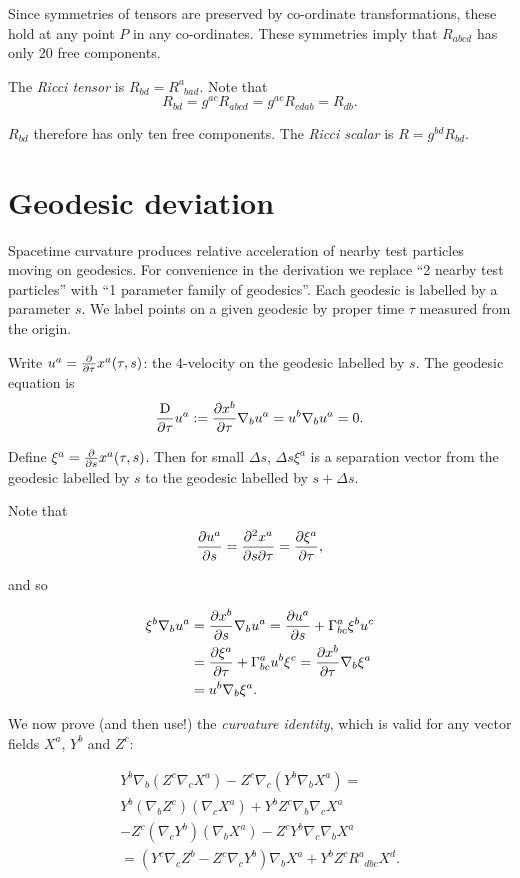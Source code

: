 \documentclass{notes}
\newcommand{\del}{\nabla}
\begin{document}
Since symmetries of tensors are preserved by co-ordinate
transformations, these hold at any point $P$ in any co-ordinates.
These symmetries imply that $R_{abcd}$ has only 20 free components.

The \emph{Ricci tensor} is $R_{bd} = R^a_{\phantom{a}bad}$.  Note that
\[
R_{bd} = g^{ac} R_{abcd} = g^{ac} R_{cdab} = R_{db}.
\]

$R_{bd}$ therefore has only ten free components.  The \emph{Ricci
  scalar} is $R = g^{bd} R_{bd}$.

\section{Geodesic deviation}

Spacetime curvature produces relative acceleration of nearby test
particles moving on geodesics.  For convenience in the derivation we
replace ``2 nearby test particles'' with ``1 parameter family of
geodesics''. Each geodesic is labelled by a parameter $s$.  We label
points on a given geodesic by proper time $\tau$ measured from the
origin.

\vspace{1.5in}

Write $u^a = \frac{\partial }{\partial \tau} x^a(\tau,s)$: the 4-velocity on the geodesic
labelled by $s$.  The geodesic equation is
\[
\frac{\uD}{\partial\tau} u^a := \pd{x^b}{\tau} \del_b u^a = u^b \del_b u^a = 0.
\]

Define $\xi^a = \frac{\partial }{\partial s} x^a(\tau,s)$.  Then for small $\Delta s$,
$\Delta s \xi^a$ is a separation vector from the geodesic labelled by
$s$ to the geodesic labelled by $s+\Delta s$.

Note that
\[
\frac{\partial u^a}{\partial s} = \frac{\partial ^2 x^a}{\partial s \partial \tau} = \frac{\partial \xi^a}{\partial \tau},
\]

and so

\begin{align*}
\xi^b \del_b u^a &= \pd{x^b}{s} \del_b u^a = \pd{u^a}{s} +
\Gamma^a_{bc} \xi^b u^c \\
&= \pd{\xi^a}{\tau} + \Gamma^a_{bc} u^b \xi^c = \pd{x^b}{\tau} \del_b \xi^a
\\
&= u^b \del_b \xi^a. 
\end{align*}

We now prove (and then use!) the \emph{curvature identity}, which is
valid for any vector fields $X^a$, $Y^b$ and $Z^c$:

\begin{multline*}
Y^b \del_b \left( Z^c \del_c X^a \right) - Z^c \del_c \left(Y^b \del_b
  X^a\right) = \\
Y^b \left( \del_b Z^c\right) \left( \del_c X^a\right)
+ Y^b Z^c \del_b \del_c X^a \\
- Z^c \left( \del_c Y^b \right) \left( \del_b X^a \right)
- Z^c Y^b \del_c \del_b X^a \\
=\left(Y^c \del_c Z^b - Z^c \del_c Y^b \right)\del_b X^a
+ Y^b Z^c R^a_{\phantom{a} dbc} X^d.
\end{multline*}
\end{document}
